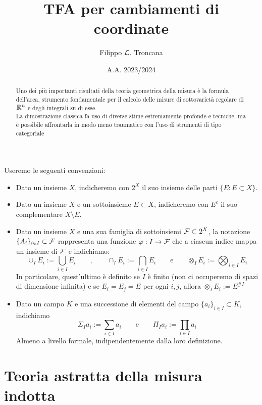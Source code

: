 \documentclass{article}
\title{TFA per cambiamenti di coordinate}
\author{Filippo $\mathcal{L}$. Troncana}
\date{A.A. 2023/2024}
\renewcommand\F{\mc{F}}
\begin{document}
\maketitle

\begin{abstract}
    Uno dei più importanti risultati della teoria geometrica della misura è la formula dell'area, strumento fondamentale per il calcolo delle misure di sottovarietà regolare di $\mathbb{R}^n$ e degli integrali su di esse.\\
    La dimostrazione classica fa uso di diverse stime estremamente profonde e tecniche, ma è possibile affrontarla in modo meno traumatico con l'uso di strumenti di tipo categoriale
\end{abstract}

\begin{notation}
    Useremo le seguenti convenzioni:\begin{itemize}
        \item Dato un insieme $X$, indicheremo con $2^X$ il suo insieme delle parti $\{E : E\subset X\}$.
        \item Dato un insieme $X$ e un sottoinsieme $E\subset X$, indicheremo con $E^c$ il suo complementare $X\setminus E$.
        \item Dato un insieme $X$ e una sua famiglia di sottoinsiemi $\F \subset 2^X$, la notazione $\{A_i\}_{i \in I} \subset \F$ rappresenta una funzione $\varphi: I \to \F$ che a ciascun indice mappa un insieme di $\F$ e indichiamo:
        \[\cup_I E_i := \bigcup_{i \in I} E_i \qquad, \qquad \cap_I E_i := \bigcap_{i \in I} E_i \qquad \text{e}\qquad \otimes_I E_i := \bigotimes_{i \in I} E_i \]
        In particolare, quest'ultimo è definito se $I$ è finito (non ci occuperemo di spazi di dimensione infinita) e se $E_i = E_j= E $ per ogni $i,j$, allora $\otimes_I E_i := E^{\# I}$
        \item Dato un campo $K$ e una successione di elementi del campo $\{a_i\}_{i \in I}\subset K$, indichiamo
        \[\Sigma_I a_i := \sum_{i \in I} a_i \qquad\text{e} \qquad \Pi_I a_i := \prod_{i \in I} a_i \]
        Almeno a livello formale, indipendentemente dalla loro definizione.
    \end{itemize}
\end{notation}

\section{Teoria astratta della misura indotta}
\end{document}
